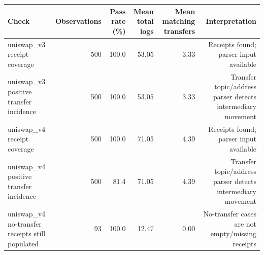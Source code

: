 \begin{tabular}{lrrrrr}
\toprule
Check & Observations & Pass rate (\%) & Mean total logs & Mean matching transfers & Interpretation \\
\midrule
uniswap\_v3 receipt coverage & 500 & 100.0 & 53.05 & 3.33 & Receipts found; parser input available \\
uniswap\_v3 positive transfer incidence & 500 & 100.0 & 53.05 & 3.33 & Transfer topic/address parser detects intermediary movement \\
uniswap\_v4 receipt coverage & 500 & 100.0 & 71.05 & 4.39 & Receipts found; parser input available \\
uniswap\_v4 positive transfer incidence & 500 & 81.4 & 71.05 & 4.39 & Transfer topic/address parser detects intermediary movement \\
uniswap\_v4 no-transfer receipts still populated & 93 & 100.0 & 12.47 & 0.00 & No-transfer cases are not empty/missing receipts \\
\bottomrule
\end{tabular}
